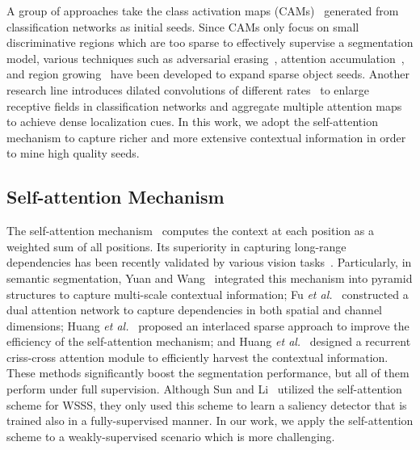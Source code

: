 \documentclass[journal]{IEEEtran}
\begin{document}
A group of approaches take the class activation maps (CAMs)~\cite{zhou2016learning} generated from classification networks as initial seeds. Since CAMs only focus on small discriminative regions which are too sparse to effectively supervise a segmentation model, various techniques such as adversarial erasing~\cite{wei2017object,li2018tell,hou2018self,chaudhry2017discovering}, attention accumulation~\cite{jiang2019integral}, and region growing~\cite{huang2018weakly,Sun2019saliency,Shimoda_2019_ICCV} have been developed to expand sparse object seeds. Another research line introduces dilated convolutions of different rates~\cite{wei2018revisiting,Jing2019dilated,lee2019ficklenet,fan2018cian} to enlarge receptive fields in classification networks and aggregate multiple attention maps to achieve dense localization cues. In this work, we adopt the self-attention mechanism to capture richer and more extensive contextual information in order to mine high quality seeds. 


\subsection{Self-attention Mechanism}
The self-attention mechanism~\cite{lin2017structured} computes the context at each position as a weighted sum of all positions. Its superiority in capturing long-range dependencies has been recently validated by various vision tasks~\cite{Wang2018nonlocal,hu2018relation,yuan2018ocnet,fu2019dual}. Particularly, in semantic segmentation, Yuan and Wang~\cite{yuan2018ocnet} integrated this mechanism into pyramid structures to capture multi-scale contextual information; Fu \textit{et al.}~\cite{fu2019dual} constructed a dual attention network to capture dependencies in both spatial and channel dimensions; Huang \textit{et al.}~\cite{Huang2019self} proposed an interlaced sparse approach to improve the efficiency of the self-attention mechanism; and Huang \textit{et al.}~\cite{Huang2019criss-cross} designed a recurrent criss-cross attention module to efficiently harvest the contextual information. These methods significantly boost the segmentation performance, but all of them perform under full supervision. Although Sun and Li~\cite{Sun2019saliency} utilized the self-attention scheme for WSSS, they only used this scheme to learn a saliency detector that is trained also in a fully-supervised manner. In our work, we apply the self-attention scheme to a weakly-supervised scenario which is more challenging.
\end{document}
